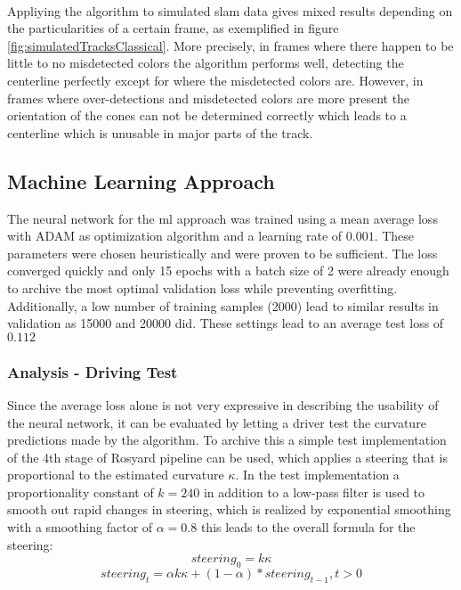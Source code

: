 \\Appliying the algorithm to simulated \ac{slam} data gives mixed results depending on the particularities of a certain frame, as exemplified in figure \ref{fig:simulatedTracksClassical}. More precisely, in frames where there happen to be little to no misdetected colors the algorithm performs well, detecting the centerline perfectly except for where the misdetected colors are. However, in frames where over-detections and misdetected colors are more present the orientation of the cones can not be determined correctly which leads to a centerline which is unusable in major parts of the track. 

\subsection{Machine Learning Approach}
The neural network for the \ac{ml} approach was trained using a mean average loss with ADAM as optimization algorithm and a learning rate of $0.001$. These parameters were chosen heuristically and were proven to be sufficient. The loss converged quickly and only 15 epochs with a batch size of 2 were already enough to archive the most optimal validation loss while preventing overfitting. Additionally, a low number of training samples (2000) lead to similar results in validation as 15000 and 20000 did. These settings lead to an average test loss of $0.112$

\subsubsection{Analysis - Driving Test}
Since the average loss alone is not very expressive in describing the usability of the neural network, it can be evaluated by letting a driver test the curvature predictions made by the algorithm. To archive this a simple test implementation of the 4th stage of Rosyard pipeline can be used, which applies a steering that is proportional to the estimated curvature $\kappa$. In the test implementation a proportionality constant of $k = 240$ in addition to a low-pass filter is used to smooth out rapid changes in steering, which is realized by exponential smoothing with a smoothing factor of $\alpha = 0.8$ this leads to the overall formula for the steering:
$$steering_0= k\kappa$$
$$steering_t= \alpha k\kappa + (1-\alpha)*steering_{t-1}, t > 0$$ 

